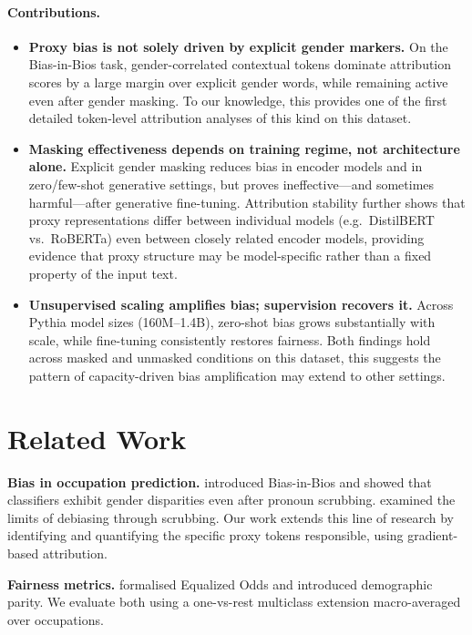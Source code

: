 \documentclass[11pt]{article}
\begin{document}
\paragraph{Contributions.}
\begin{itemize}
  \item \textbf{Proxy bias is not solely driven by explicit gender markers.} On the Bias-in-Bios task, gender-correlated
  contextual tokens dominate attribution scores by a large margin over
  explicit gender words, while remaining active even after gender masking.
  To our knowledge, this provides one of the first detailed token-level
  attribution analyses of this kind on this dataset.
  \item \textbf{Masking effectiveness depends on training regime, not architecture alone.} Explicit gender masking reduces bias in encoder models and in zero/few-shot generative settings, but proves ineffective—and sometimes harmful—after generative fine-tuning. Attribution stability further shows that proxy representations differ between individual models (e.g.\ DistilBERT vs.\ RoBERTa) even between closely related encoder models, providing evidence that proxy structure may be model-specific rather than a fixed property of the input text.
  \item \textbf{Unsupervised scaling amplifies bias; supervision
  recovers it.} Across Pythia model sizes (160M--1.4B), zero-shot bias
  grows substantially with scale, while fine-tuning consistently
  restores fairness. Both findings hold across masked and unmasked
  conditions on this dataset, this suggests the pattern of
  capacity-driven bias amplification may extend to other settings.
\end{itemize}

\section{Related Work}

\textbf{Bias in occupation prediction.}
\citet{de-arteaga-etal-2019-bias} introduced Bias-in-Bios and showed that
classifiers exhibit gender disparities even after pronoun scrubbing.
\citet{romanov-etal-2019-whats} examined the limits of debiasing through
scrubbing. Our work extends this line of research by identifying and
quantifying the specific proxy tokens responsible, using gradient-based
attribution.

\textbf{Fairness metrics.}
\citet{hardt2016equality} formalised Equalized Odds and
\citet{dwork2012fairness} introduced demographic parity. We evaluate both
using a one-vs-rest multiclass extension macro-averaged over occupations.
\end{document}
